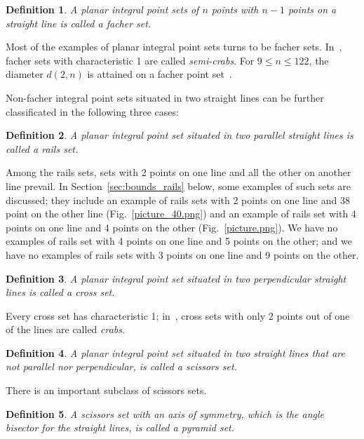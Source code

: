 \documentclass[12pt]{article}
\theoremstyle{theorem}
\theoremstyle{dfn}
\newtheorem{dfn}{Definition}
\theoremstyle{remark}
\begin{document}
\begin{dfn}
	A planar integral point sets of $n$ points with $n-1$ points on a straight line is called
	a \textit{facher} set.
\end{dfn}
Most of the examples of planar integral point sets turns to be facher sets.
In~\cite{antonov2008maximal}, facher sets with characteristic 1 are called \textit{semi-crabs}.
For $9 \leq n \leq 122$, the diameter $d(2,n)$ is attained on a facher point set~\cite{kurz2008minimum}.

Non-facher integral point sets situated in two straight lines
can be further classificated in the following three cases:

\begin{dfn}
	A planar integral point set situated in two parallel straight lines
	is called a \textit{rails} set.
\end{dfn}

Among the rails sets, sets with 2 points on one line and all the other on another line prevail.
In Section~\ref{sec:bounds_rails} below, some examples of such sets are discussed;
they include an example of rails sets with 2 points on one line and 38 point on the other line
(Fig.~\ref{picture_40.png})
and
an example of rails set with 4 points on one line and 4 points on the other
(Fig.~\ref{picture.png}).
We have no examples of rails set with 4 points on one line and 5 points on the other;
and we have no examples of rails sets with 3 points on one line and 9 points on the other.


\begin{dfn}
	A planar integral point set situated in two perpendicular straight lines
	is called a \textit{cross} set.
\end{dfn}
Every cross set has characteristic 1;
in~\cite{antonov2008maximal}, cross sets with only 2 points out of one of the lines are called \textit{crabs}.

\begin{dfn}
	A planar integral point set situated in two straight lines
	that are not parallel nor perpendicular,
	is called a \textit{scissors} set.
\end{dfn}

There is an important subclass of scissors sets.

\begin{dfn}
	A scissors set with an axis of symmetry,
	which is the angle bisector for the straight lines,
	is called a \textit{pyramid} set.
\end{dfn}
\end{document}
